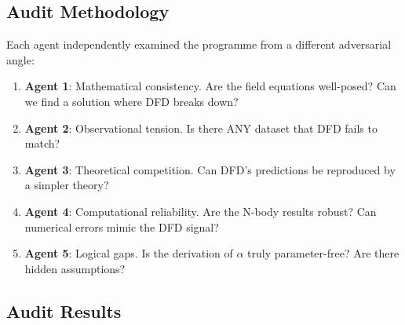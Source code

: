 \documentclass[11pt,a4paper]{article}
\begin{document}
\subsection{Audit Methodology}

Each agent independently examined the programme from a different adversarial angle:

\begin{enumerate}
\item \textbf{Agent 1}: Mathematical consistency. Are the field equations well-posed? Can we find a solution where DFD breaks down?
\item \textbf{Agent 2}: Observational tension. Is there ANY dataset that DFD fails to match?
\item \textbf{Agent 3}: Theoretical competition. Can DFD's predictions be reproduced by a simpler theory?
\item \textbf{Agent 4}: Computational reliability. Are the N-body results robust? Can numerical errors mimic the DFD signal?
\item \textbf{Agent 5}: Logical gaps. Is the derivation of $\alpha$ truly parameter-free? Are there hidden assumptions?
\end{enumerate}

\subsection{Audit Results}
\end{document}
